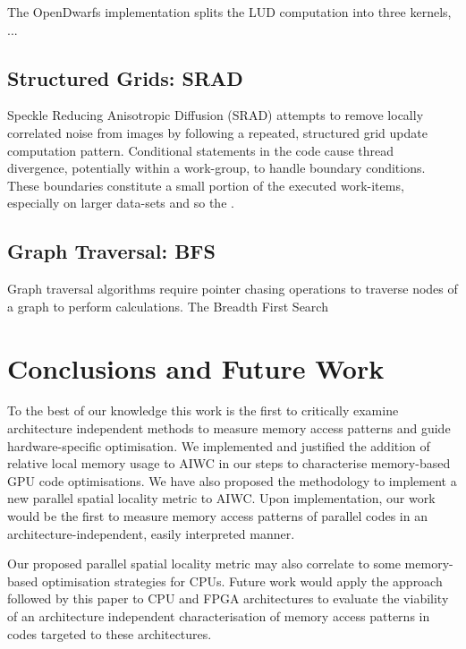\documentclass[review=false, sigchi]{acmart}
\begin{document}
	The OpenDwarfs implementation \cite{opendwarfs2017base} splits the LUD computation into three kernels, ...  %
	
	\subsection{Structured Grids: SRAD}
	
	Speckle Reducing Anisotropic Diffusion (SRAD) attempts to remove locally correlated noise from images by following a repeated, structured grid update computation pattern. Conditional statements in the code cause thread divergence, potentially within a work-group, to handle boundary conditions. These boundaries constitute a small portion of the executed work-items, especially on larger data-sets and so the .
	
	\subsection{Graph Traversal: BFS}
	
	Graph traversal algorithms require pointer chasing operations to traverse nodes of a graph to perform calculations. The Breadth First Search 
	
	\section{Conclusions and Future Work} \label{future work}
	
	To the best of our knowledge this work is the first to critically examine architecture independent methods to measure memory access patterns and guide hardware-specific optimisation. We implemented and justified the addition of relative local memory usage to AIWC in our steps to characterise memory-based GPU code optimisations. We have also proposed the methodology to implement a new parallel spatial locality metric to AIWC. Upon implementation, our work would be the first to measure memory access patterns of parallel codes in an architecture-independent, easily interpreted manner.
	
	Our proposed parallel spatial locality metric may also correlate to some memory-based optimisation strategies for CPUs. Future work would apply the approach followed by this paper to CPU and FPGA architectures to evaluate the viability of an architecture independent characterisation of memory access patterns in codes targeted to these architectures.
	
\end{document}
